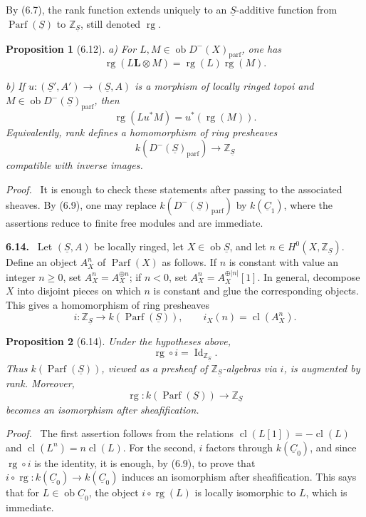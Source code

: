 \documentclass[13pt]{extarticle}
\newcommand{\ZZ}{\mathbb Z}
\newcommand{\uS}{\underline S}
\newcommand{\uC}{\underline C}
\newcommand{\rg}{\operatorname{rg}}
\newcommand{\ob}{\operatorname{ob}}
\newcommand{\Parf}{\operatorname{Parf}}
\newcommand{\bbL}{\mathbin{\mathbf L\!\otimes}}
\newenvironment{statement}[1]{\par\medskip\noindent\textbf{#1.}\ }{\par\medskip}
\newenvironment{prooftext}[1][Proof]{\par\noindent\emph{#1.}\ }{\par\medskip}
\newtheorem*{proposition*}{Proposition}
\begin{document}
By (6.7), the rank function extends uniquely to an $\uS$-additive function from $\Parf(\uS)$ to $\ZZ_{\uS}$, still denoted $\rg$.

\begin{proposition*}[6.12]
\textup{a)} For $L,M\in\ob D^-(X)_{\mathrm{parf}}$, one has
\[
\rg(L\bbL M)=\rg(L)\rg(M).
\]

\textup{b)} If $u:(\uS',A')\to(\uS,A)$ is a morphism of locally ringed topoi and $M\in\ob D^-(\uS)_{\mathrm{parf}}$, then
\[
\rg(Lu^*M)=u^*(\rg(M)).
\]
Equivalently, rank defines a homomorphism of ring presheaves
\[
k(D^-(\uS)_{\mathrm{parf}})\longrightarrow\ZZ_{\uS}
\]
compatible with inverse images.
\end{proposition*}

\begin{prooftext}
It is enough to check these statements after passing to the associated sheaves. By (6.9), one may replace $k(D^-(\uS)_{\mathrm{parf}})$ by $k(\uC_1)$, where the assertions reduce to finite free modules and are immediate.
\end{prooftext}

\begin{statement}{6.14}
Let $(\uS,A)$ be locally ringed, let $X\in\ob\uS$, and let $n\in H^0(X,\ZZ_{\uS})$. Define an object $A_X^n$ of $\Parf(X)$ as follows. If $n$ is constant with value an integer $n\geq0$, set $A_X^n=A_X^{\oplus n}$; if $n<0$, set $A_X^n=A_X^{\oplus |n|}[1]$. In general, decompose $X$ into disjoint pieces on which $n$ is constant and glue the corresponding objects. This gives a homomorphism of ring presheaves
\[
i:\ZZ_{\uS}\longrightarrow k(\Parf(\uS)),
\qquad i_X(n)=\operatorname{cl}(A_X^n).
\]
\end{statement}

\begin{proposition*}[6.14]
Under the hypotheses above,
\[
\rg\circ i=\operatorname{Id}_{\ZZ_{\uS}}.
\]
Thus $k(\Parf(\uS))$, viewed as a presheaf of $\ZZ_{\uS}$-algebras via $i$, is augmented by rank. Moreover,
\[
\rg:k(\Parf(\uS))\longrightarrow\ZZ_{\uS}
\]
becomes an isomorphism after sheafification.
\end{proposition*}

\begin{prooftext}
The first assertion follows from the relations $\operatorname{cl}(L[1])=-\operatorname{cl}(L)$ and $\operatorname{cl}(L^n)=n\operatorname{cl}(L)$. For the second, $i$ factors through $k(\uC_0)$, and since $\rg\circ i$ is the identity, it is enough, by (6.9), to prove that $i\circ\rg:k(\uC_0)\to k(\uC_0)$ induces an isomorphism after sheafification. This says that for $L\in\ob\uC_0$, the object $i\circ\rg(L)$ is locally isomorphic to $L$, which is immediate.
\end{prooftext}
\end{document}
